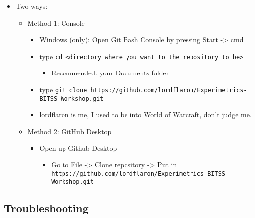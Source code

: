 \documentclass[10pt,parskip=half,
	toc=sectionentrywithdots,
	bibliography=totocnumbered,
	captions=tableheading,numbers=noendperiod]{scrartcl}
\providecommand{\tightlist}{%
  \setlength{\itemsep}{0pt}\setlength{\parskip}{0pt}}
\begin{document}
\begin{itemize}
\tightlist
\item
  Two ways:

  \begin{itemize}
  \tightlist
  \item
    Method 1: Console

    \begin{itemize}
    \tightlist
    \item
      Windows (only): Open Git Bash Console by pressing Start
      -\textgreater{} cmd
    \item
      type
      \texttt{cd\ \textless{}directory\ where\ you\ want\ to\ the\ repository\ to\ be\textgreater{}}

      \begin{itemize}
      \tightlist
      \item
        Recommended: your Documents folder
      \end{itemize}
    \item
      type
      \texttt{git\ clone\ https://github.com/lordflaron/Experimetrics-BITSS-Workshop.git}
    \item
      lordflaron is me, I used to be into World of Warcraft, don't judge
      me.
    \end{itemize}
  \item
    Method 2: GitHub Desktop

    \begin{itemize}
    \tightlist
    \item
      Open up Github Desktop

      \begin{itemize}
      \tightlist
      \item
        Go to File -\textgreater{} Clone repository -\textgreater{} Put
        in
        \texttt{https://github.com/lordflaron/Experimetrics-BITSS-Workshop.git}
      \end{itemize}
    \end{itemize}
  \end{itemize}
\end{itemize}

\hypertarget{troubleshooting}{%
\subsection{Troubleshooting}\label{troubleshooting}}
\end{document}
